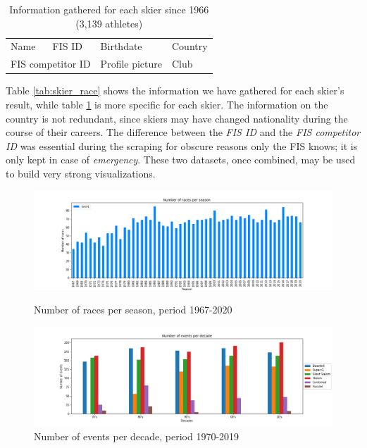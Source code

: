 \begin{table}[h]
    \centering
    \begin{tabular}{|llll|}
        \hline
        Name & FIS ID & Birthdate & Country\\
        \multicolumn{2}{|l}{FIS competitor ID} & Profile picture & Club\\
        \hline
    \end{tabular}
    \caption{Information gathered for each skier since 1966 (3,139 athletes)}
    \label{tab:skier_profile}
\end{table}

Table \ref{tab:skier_race} shows the information we have gathered for each skier's result, while table \ref{tab:skier_profile} is more specific for each skier.
The information on the country is not redundant, since skiers may have changed nationality during the course of their careers.
The difference between the \textit{FIS ID} and the \textit{FIS competitor ID} was essential during the scraping for obscure reasons only the FIS knows; it is only kept in case of \textit{emergency}.
These two datasets, once combined, may be used to build very strong visualizations.

\begin{figure}[ht]
    \centering
    \includegraphics[width=\linewidth]{img/races_per_year.png}
    \caption{Number of races per season, period 1967-2020}
    \label{fig:races_year}
    \centering
    \includegraphics[width=\linewidth]{img/events_per_decades.png}
    \caption{Number of events per decade, period 1970-2019}
    \label{fig:events_decade}
\end{figure}

